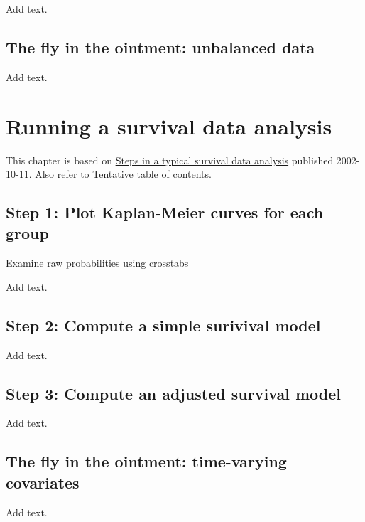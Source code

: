 \documentclass[
  letterpaper,
  DIV=11,
  numbers=noendperiod]{scrreprt}
\begin{document}
Add text.

\section{The fly in the ointment: unbalanced
data}\label{the-fly-in-the-ointment-unbalanced-data}

Add text.


\chapter{Running a survival data
analysis}\label{running-a-survival-data-analysis}

This chapter is based on
\href{http://www.new.pmean.com/steps-in-survival-analysis/}{Steps in a
typical survival data analysis} published 2002-10-11. Also refer to
\href{http://www.pmean.com/10/Contents.html}{Tentative table of
contents}.

\section{Step 1: Plot Kaplan-Meier curves for each
group}\label{step-1-plot-kaplan-meier-curves-for-each-group}

Examine raw probabilities using crosstabs

Add text.

\section{Step 2: Compute a simple surivival
model}\label{step-2-compute-a-simple-surivival-model}

Add text.

\section{Step 3: Compute an adjusted survival
model}\label{step-3-compute-an-adjusted-survival-model}

Add text.

\section{The fly in the ointment: time-varying
covariates}\label{the-fly-in-the-ointment-time-varying-covariates}

Add text.

\end{document}
